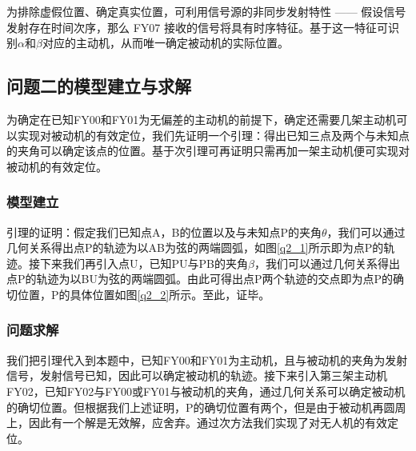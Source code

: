 \documentclass[withoutpreface,bwprint]{cumcmthesis} %
\begin{document}
为排除虚假位置、确定真实位置，可利用信号源的非同步发射特性 —— 假设信号发射存在时间次序，那么 FY07 接收的信号将具有时序特征。基于这一特征可识别$\alpha$和$\beta$对应的主动机，从而唯一确定被动机的实际位置。


\subsection{问题二的模型建立与求解}
为确定在已知FY00和FY01为无偏差的主动机的前提下，确定还需要几架主动机可以实现对被动机的有效定位，我们先证明一个引理：得出已知三点及两个与未知点的夹角可以确定该点的位置。基于次引理可再证明只需再加一架主动机便可实现对被动机的有效定位。

\subsubsection{模型建立}
引理的证明：假定我们已知点A，B的位置以及与未知点P的夹角$\theta$，我们可以通过几何关系得出点P的轨迹为以AB为弦的两端圆弧，如图\ref{q2_1}所示即为点P的轨迹。接下来我们再引入点U，已知PU与PB的夹角$\beta$，我们可以通过几何关系得出点P的轨迹为以BU为弦的两端圆弧。由此可得出点P两个轨迹的交点即为点P的确切位置，P的具体位置如图\ref{q2_2}所示。至此，证毕。

\subsubsection{问题求解}
我们把引理代入到本题中，已知FY00和FY01为主动机，且与被动机的夹角为发射信号，发射信号已知，因此可以确定被动机的轨迹。接下来引入第三架主动机FY02，已知FY02与FY00或FY01与被动机的夹角，通过几何关系可以确定被动机的确切位置。但根据我们上述证明，P的确切位置有两个，但是由于被动机再圆周上，因此有一个解是无效解，应舍弃。通过次方法我们实现了对无人机的有效定位。
\end{document}
